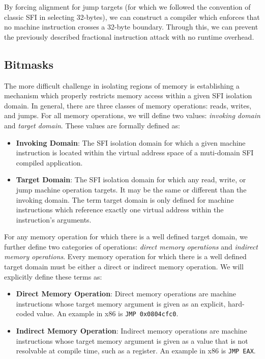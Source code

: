\documentclass[12pt]{IEEEtran}
\begin{document}
By forcing alignment for jump targets (for which we followed the convention of classic SFI in selecting 32-bytes), we can construct a compiler which enforces that no machine instruction crosses a 32-byte boundary. Through this, we can prevent the previously described fractional instruction attack with no runtime overhead.

\subsection{Bitmasks} \label{bitmasks}

The more difficult challenge in isolating regions of memory is establishing a mechanism which properly restricts memory access within a given SFI isolation domain. In general, there are three classes of memory operations: reads, writes, and jumps. For all memory operations, we will define two values: \textit{invoking domain} and \textit{target domain}. These values are formally defined as:

\begin{itemize}
\item \textbf{Invoking Domain}: The SFI isolation domain for which a given machine instruction is located within the virtual address space of a muti-domain SFI compiled application.
\item \textbf{Target Domain}: The SFI isolation domain for which any read, write, or jump machine operation targets. It may be the same or different than the invoking domain. The term target domain is only defined for machine instructions which reference exactly one virtual address within the instruction's arguments.
\end{itemize}

For any memory operation for which there is a well defined target domain, we further define two categories of operations: \textit{direct memory operations} and \textit{indirect memory operations}. Every memory operation for which there is a well defined target domain must be either a direct or indirect memory operation. We will explicitly define these terms as:

\begin{itemize}
\item \textbf{Direct Memory Operation}: Direct memory operations are machine instructions whose target memory argument is given as an explicit, hard-coded value. An example in x86 is \texttt{JMP 0x0804cfc0}.
\item \textbf{Indirect Memory Operation}: Indirect memory operations are machine instructions whose target memory argument is given as a value that is not resolvable at compile time, such as a register. An example in x86 is \texttt{JMP EAX}.
\end{itemize}
\end{document}
